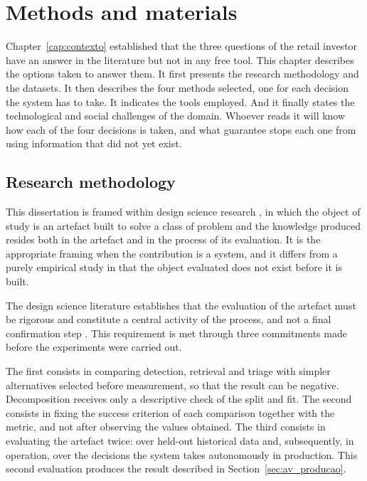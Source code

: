 \chapter{Methods and materials}
\label{cap:metodologia}

Chapter~\ref{cap:contexto} established that the three questions of the retail investor have an
answer in the literature but not in any free tool. This chapter describes the options taken to
answer them. It first presents the research methodology and the datasets. It then describes the
four methods selected, one for each decision the system has to take. It indicates the tools
employed. And it finally states the technological and social challenges of the domain. Whoever reads it will know how each of the four decisions is taken, and what guarantee stops each one from using information that did not yet exist.

\section{Research methodology}
\label{sec:met_metodologia}

This dissertation is framed within design science research \autocite{hevner2004design}, in which
the object of study is an artefact built to solve a class of problem and the knowledge produced
resides both in the artefact and in the process of its evaluation. It is the appropriate framing
when the contribution is a system, and it differs from a purely empirical study in that the object
evaluated does not exist before it is built.

The design science literature establishes that the evaluation of the artefact must be rigorous and
constitute a central activity of the process, and not a final confirmation step
\autocite{hevner2004design, peffers2007dsrm}. This requirement is met through three commitments
made before the experiments were carried out.

The first consists in comparing detection, retrieval and triage with simpler alternatives selected
before measurement, so that the result can be negative. Decomposition receives only a descriptive
check of the split and fit. The second consists in
fixing the success criterion of each comparison together with the metric, and not after observing
the values obtained. The third consists in evaluating the artefact twice: over held-out historical
data and, subsequently, in operation, over the decisions the system takes autonomously in
production. This second evaluation produces the
result described in Section~\ref{sec:av_producao}.

